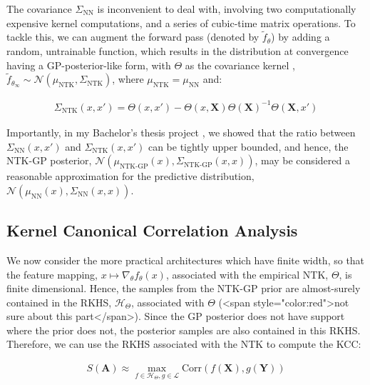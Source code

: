 \documentclass[a4paper,12pt]{article}
\begin{document}
The covariance $\Sigma_{\text{NN}}$ is inconvenient to deal with, involving two computationally expensive kernel computations, and a series of cubic-time matrix operations. To tackle this, we can augment the forward pass (denoted by $\tilde{f}_{\theta}$) by adding a random, untrainable function, which results in the distribution at convergence having a GP-posterior-like form, with $\Theta$ as the covariance kernel \cite{bobby_2020_bayesian-ensembles-ntk}, $\tilde{f}_{\theta_{\infty}} \sim \mathcal{N}\left(\mu_{\text{NTK}},\Sigma_{\text{NTK}}\right)$, where $\mu_{\text{NTK}} = \mu_{\text{NN}}$ and:

\begin{align}
    \Sigma_{\text{NTK}}\left(x,x'\right) = \Theta\left(x,x'\right) - \Theta\left(x,\mathbf{X}\right) \Theta\left(\mathbf{X}\right)^{-1} \Theta\left(\mathbf{X},x'\right)
\end{align}

Importantly, in my Bachelor's thesis project \cite{hemachandra23a}, we showed that the ratio between $\Sigma_{\text{NN}}\left(x,x'\right)$ and $\Sigma_{\text{NTK}}\left(x,x'\right)$ can be tightly upper bounded, and hence, the NTK-GP posterior, $\mathcal{N}\left(\mu_{\text{NTK-GP}}\left(x\right),\Sigma_{\text{NTK-GP}}\left(x,x\right)\right)$, may be considered a reasonable approximation for the predictive distribution, $\mathcal{N}\left(\mu_{\text{NN}}\left(x\right),\Sigma_{\text{NN}}\left(x,x\right)\right)$.

\subsection{Kernel Canonical Correlation Analysis}

We now consider the more practical architectures which have finite width, so that the feature mapping, $x \mapsto \nabla_{\theta}f_{\theta}\left(x\right)$, associated with the empirical NTK, $\Theta$, is finite dimensional. Hence, the samples from the NTK-GP prior are almost-surely contained in the RKHS, $\mathcal{H}_{\Theta}$, associated with $\Theta$ (<span style="color:red">not sure about this part</span>). Since the GP posterior does not have support where the prior does not, the posterior samples are also contained in this RKHS. Therefore, we can use the RKHS associated with the NTK to compute the KCC:

\begin{align}
    S\left(\mathbf{A}\right)
    \approx \max_{f\in\mathcal{H}_{\Theta}, g\in\mathcal{L}} \text{Corr}\left(f\left(\mathbf{X}\right), g\left(\mathbf{Y}\right)\right)
\end{align}
\end{document}
